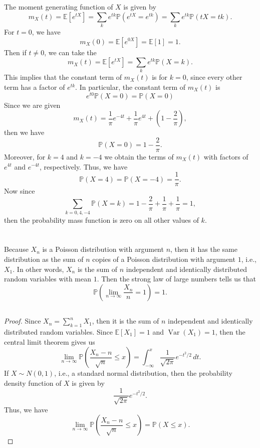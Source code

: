 \documentclass[12pt]{article}
\renewcommand{\P}{\mathbb{P}}
\newcommand{\E}{\mathbb{E}}
\newcommand{\Var}{\operatorname{Var}}
\begin{document}
The moment generating function of $X$ is given by
\[
    m_X(t) = \E[e^{tX}] = \sum_{k} e^{tk} \P(e^{tX} = e^{tk}) = \sum_{k} e^{tk} \P(tX = tk).
\]
For $t = 0$, we have
\[
    m_X(0) = \E[e^{0X}] = \E[1] = 1.
\]
Then if $t \ne 0$, we can take the
\[
    m_X(t) = \E[e^{tX}] = \sum_{k} e^{tk} \P(X = k).
\]
This implies that the constant term of $m_X(t)$ is for $k = 0$, since every other term has a factor of $e^{tk}$. In particular, the constant term of $m_X(t)$ is
\[
    e^{t0} \P(X = 0) = \P(X = 0)
\]
Since we are given
\[
    m_X(t) = \frac{1}{\pi}e^{-4t} + \frac{1}{\pi}e^{4t} + \left( 1 - \frac{2}{\pi} \right),
\]
then we have
\[
    \P(X = 0) = 1 - \frac{2}{\pi}.
\]
Moreover, for $k = 4$ and $k = -4$ we obtain the terms of $m_X(t)$ with factors of $e^{4t}$ and $e^{-4t}$, respectively. Thus, we have
\[
    \P(X = 4) = \P(X = -4) = \frac{1}{\pi}.
\]
Now since
\[
    \sum_{k = 0, 4, -4} \P(X = k) = 1 - \frac{2}{\pi} + \frac{1}{\pi} + \frac{1}{\pi} = 1,
\]
then the probability mass function is zero on all other values of $k$.


\section{}

\subsection{}

Because $X_n$ is a Poisson distribution with argument $n$, then it has the same distribution as the sum of $n$ copies of a Poisson distribution with argument $1$, i.e., $X_1$. In other words, $X_n$ is the sum of $n$ independent and identically distributed random variables with mean $1$. Then the strong law of large numbers tells us that
\[
    \P \left( \lim_{n \to \infty} \frac{X_n}{n} = 1 \right) = 1.
\]

\subsection{}

\begin{proof}
    Since $X_n = \sum_{k=1}^n X_1$, then it is the sum of $n$ independent and identically distributed random variables. Since $\E[X_1] = 1$ and $\Var(X_1) = 1$, then the central limit theorem gives us
    \[
        \lim_{n \to \infty} \P \left( \frac{X_n - n}{\sqrt{n}} \leq x \right) 
            = \int_{-\infty}^x \frac{1}{\sqrt{2\pi}} e^{-t^2/2} \,dt.
    \]
    If $X \sim N(0,1)$, i.e., a standard normal distribution, then the probability density function of $X$ is given by
    \[
        \frac{1}{\sqrt{2\pi}} e^{-t^2/2}.
    \]
    Thus, we have
    \[
         \lim_{n \to \infty} \P \left( \frac{X_n - n}{\sqrt{n}} \leq x \right) 
            = \P(X \leq x).
    \]
    
\end{proof}
\end{document}
